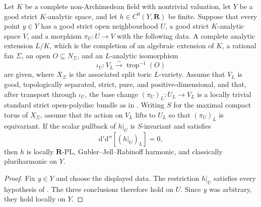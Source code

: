 \pagebreak
\begin{corollary}
\label{cor:p062-local-algebraic-split-invariant-toric-open-polydisc-bundles}
Let \(K\) be a complete non-Archimedean field with nontrivial valuation, let
\(Y\) be a good strict \(K\)-analytic space, and let
\(h\in C^0(Y,\mathbf R)\) be finite.  Suppose that every point \(y\in Y\)
has a good strict open neighbourhood \(U\), a good strict \(K\)-analytic
space \(V\), and a morphism \(\pi_U:U\to V\) with the following data.  A
complete analytic extension \(L/K\), which is the completion of an algebraic
extension of \(K\), a rational fan \(\Sigma\), an open
\(O\subseteq N_\Sigma\), and an \(L\)-analytic isomorphism
\[
             \iota_U:V_L\xrightarrow{\sim}\operatorname{trop}^{-1}(O)
\]
are given, where \(X_\Sigma\) is the associated split toric \(L\)-variety.
Assume that \(V_L\) is good, topologically separated, strict, pure, and
positive-dimensional, and that, after transport through \(\iota_U\), the
base change \((\pi_U)_L:U_L\to V_L\) is a locally trivial standard strict
open-polydisc bundle as in
.  Writing \(S\) for the
maximal compact torus of \(X_\Sigma\), assume that its action on \(V_L\)
lifts to \(U_L\) so that \((\pi_U)_L\) is equivariant.  If the scalar pullback of \(h|_U\) is
\(S\)-invariant and satisfies
\[
                 \mathrm d'\mathrm d''[(h|_U)_L]=0,
\]
then \(h\) is locally \(\mathbf R\)-PL, Gubler--Jell--Rabinoff harmonic,
and classically pluriharmonic on \(Y\).
\end{corollary}

\begin{proof}
Fix \(y\in Y\) and choose the displayed data.  The restriction \(h|_U\)
satisfies every hypothesis of
.
The three conclusions therefore hold on \(U\).  Since \(y\) was arbitrary,
they hold locally on \(Y\).
\end{proof}

